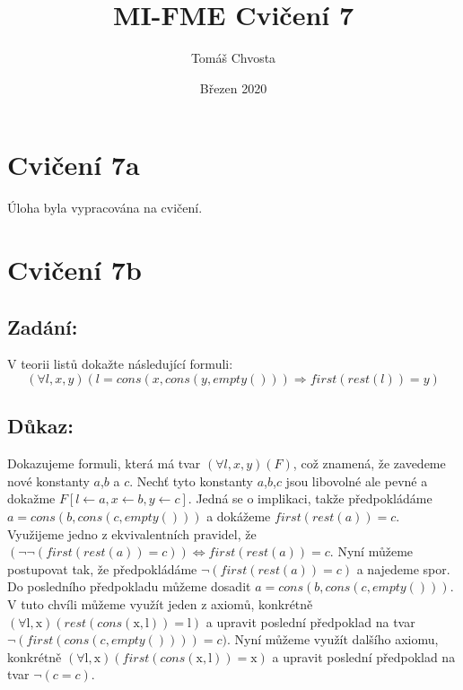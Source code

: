 \documentclass{article}
\title{MI-FME Cvičení 7}
\author{Tomáš Chvosta}
\date{Březen 2020}
\begin{document}
\maketitle

\section{Cvičení 7a}
Úloha byla vypracována na cvičení.

\section{Cvičení 7b}

\subsection{Zadání:}

V teorii listů dokažte následující formuli:
$$(\forall l, x, y)(l = cons(x, cons(y, empty())) \Rightarrow first(rest(l)) = y)$$


\subsection{Důkaz:}
Dokazujeme formuli, která má tvar $(\forall l,x,y)(F)$, což znamená, že zavedeme nové konstanty $a$,$b$ a $c$. Nechť tyto konstanty $a$,$b$,$c$ jsou libovolné ale pevné a dokažme $F[l\leftarrow a,x \leftarrow b, y \leftarrow c]$. Jedná se o implikaci, takže předpokládáme $a = cons(b, cons(c, empty()))$ a dokážeme $first(rest(a)) = c$.  Využijeme jedno z ekvivalentních pravidel, že $(\neg \neg(first(rest(a)) = c)) \Leftrightarrow  first(rest(a)) = c$. Nyní můžeme postupovat tak, že předpokládáme $\neg(first(rest(a)) = c)$ a najedeme spor. Do posledního předpokladu můžeme dosadit $a = cons(b, cons(c, empty()))$. V tuto chvíli můžeme využít jeden z axiomů, konkrétně $(\forall \mathrm{l,x})(rest(cons(\mathrm{x,l}))=\mathrm{l})$ a upravit poslední předpoklad na tvar $\neg(first(cons(c, empty()))) = c)$. Nyní můžeme využít dalšího axiomu, konkrétně $(\forall \mathrm{l,x})(first(cons(\mathrm{x,l}))=\mathrm{x})$ a upravit poslední předpoklad na tvar $\neg(c=c)$.
\end{document}
